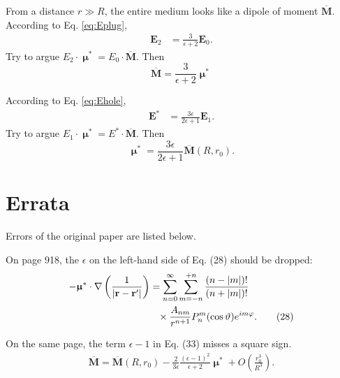 \documentclass[11pt]{article}
\newcommand{\vct}[1]{\boldsymbol{\mathbf{#1}}}
\newcommand{\vr}{\vct{r}}
\newcommand{\vE}{\vct{E}}
\newcommand{\vM}{\vct{M}}
\newcommand{\vMbar}{\overline{\vct{M}}}
\newcommand{\vmu}{\vct{\upmu}}
\begin{document}
From a distance $r \gg R$,
the entire medium looks like a dipole of moment $\vMbar$.
%
According to Eq. \eqref{eq:Eplug},
\begin{align*}
  \vE_2
&=
  \frac{ 3 } { \epsilon + 2 } \vE_0.
\end{align*}
%
Try to argue
$E_2 \cdot \vmu^* = E_0 \cdot \vMbar$.
Then
\begin{equation}
  \vMbar
=
  \frac{ 3 } { \epsilon + 2 } \vmu^*
\end{equation}

According to Eq. \eqref{eq:Ehole},
\begin{align*}
  \vE^*
&=
  \frac{ 3 \epsilon } { 2 \epsilon + 1 } \vE_1.
\end{align*}
Try to argue
$E_1 \cdot \vmu^* = E^* \cdot \vMbar$.
Then
\begin{equation}
  \vmu^*
=
  \frac{ 3 \epsilon } { 2 \epsilon + 1}
  \vMbar(R, r_0).
\end{equation}



\section{Errata}



Errors of the original paper are listed below.

On page 918, the $\epsilon$ on the left-hand side of Eq. (28)
should be dropped:
\begin{align}
  -\vct\upmu^*\cdot
  \nabla
  \left(
    \frac { 1 }
    { |\vr - \vr'| }
  \right)
&=
  \sum_{n = 0}^\infty
  \sum_{m = -n}^{+n}
  \frac { ( n - |m| )! } { ( n + |m| )! }
  \notag
  \\
&\hphantom{=}\times
  \frac { A_{nm} } { r^{n + 1} }
  P_n^m(\cos\vartheta) e^{im \varphi}.
  \tag{28}
\end{align}

On the same page, the term $\epsilon - 1$ in Eq. (33) misses a square sign.
\begin{align}
\overline {\vM}
=
\overline {\vM}(R, r_0)
-
\frac{2}{3\epsilon}
\frac{(\epsilon - 1)^2}{\epsilon + 2}
\vct\upmu^*
+ O\left( \frac{ r_0^3 } { R^3 } \right).
\tag{33}
\end{align}




\end{document}
